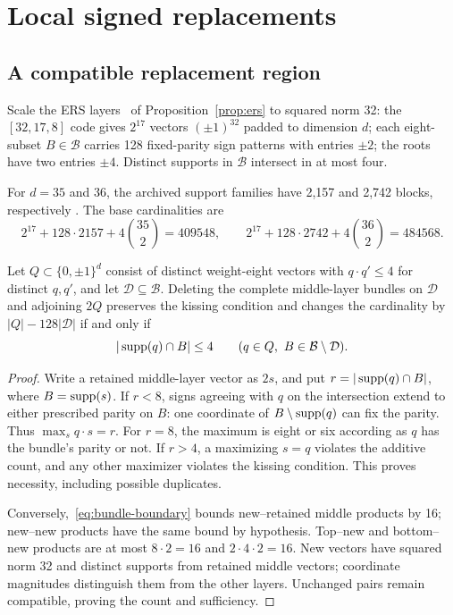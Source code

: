 \section{Local signed replacements}\label{sec:signed}
\subsection{A compatible replacement region}
Scale the ERS layers~\cite{ers} of Proposition~\ref{prop:ers} to squared norm 32:
the $[32,17,8]$ code gives $2^{17}$ vectors $(\pm1)^{32}$ padded to
dimension $d$; each eight-subset $B\in\mathcal B$ carries 128
fixed-parity sign patterns with entries $\pm2$; the roots have two
entries $\pm4$. Distinct supports in $\mathcal B$ intersect in at most four.

For $d=35$ and $36$, the archived support families have 2,157 and 2,742
blocks, respectively \cite{brouwer}. The base cardinalities are
\[
 2^{17}+128\cdot2157+4\binom{35}{2}=409548,
 \qquad
 2^{17}+128\cdot2742+4\binom{36}{2}=484568.
\]

\begin{proposition}\label{prop:bundle-boundary}
Let $Q\subset\{0,\pm1\}^{d}$ consist of distinct weight-eight vectors
with $q\cdot q'\le4$ for distinct $q,q'$, and let
$\mathcal D\subseteq\mathcal B$.
Deleting the complete middle-layer bundles on $\mathcal D$ and adjoining
$2Q$ preserves the kissing condition and changes the cardinality by
$|Q|-128|\mathcal D|$ if and only if
\begin{equation}\label{eq:bundle-boundary}
 |\operatorname{supp}(q)\cap B|\le4
 \qquad(q\in Q,\ B\in\mathcal B\setminus\mathcal D).
\end{equation}
\end{proposition}
\begin{proof}
Write a retained middle-layer vector as $2s$, and put
$r=|\operatorname{supp}(q)\cap B|$, where $B=\operatorname{supp}(s)$. If $r<8$, signs agreeing
with $q$ on the intersection extend to either prescribed parity on $B$:
one coordinate of $B\setminus\operatorname{supp}(q)$ can fix the parity.
Thus $\max_s q\cdot s=r$. For $r=8$, the maximum is eight or six
according as $q$ has the bundle's parity or not. If $r>4$, a maximizing
$s=q$ violates the additive count, and any other maximizer violates
the kissing condition. This proves necessity, including possible duplicates.

Conversely,~\eqref{eq:bundle-boundary} bounds new--retained middle
products by 16; new--new products have the same bound by hypothesis.
Top--new and bottom--new products are at most $8\cdot2=16$ and
$2\cdot4\cdot2=16$. New vectors have squared norm 32 and distinct
supports from retained middle vectors; coordinate magnitudes distinguish
them from the other layers. Unchanged pairs remain compatible, proving
the count and sufficiency.
\end{proof}

